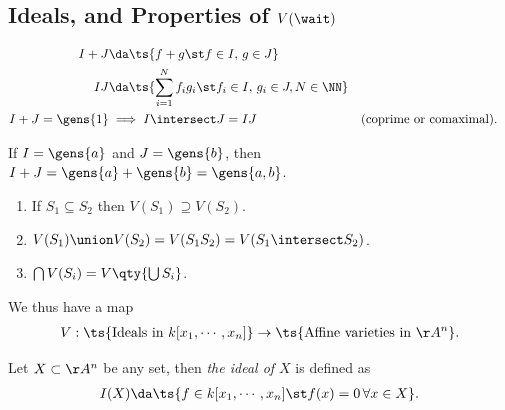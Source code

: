 \hypertarget{ideals-and-properties-of-vwait}{%
\subsection{\texorpdfstring{Ideals, and Properties of
\(V(\wait)\)}{Ideals, and Properties of V(\textbackslash wait)}}\label{ideals-and-properties-of-vwait}}

\begin{proposition}

\begin{align*}  
I+J   &\da \ts{f+g \st f\in I,\, g\in J} \\
IJ    &\da \ts{\sum_{i=1}^N f_i g_i \st f_i\in I,\, g_i\in J, N\in \NN} \\
I+J   = \gens{1} 
      &\implies I\intersect J = IJ && \text{(coprime or comaximal)}
.\end{align*}

\end{proposition}

\begin{fact}

If \(I = \gens{a}\) and \(J = \gens{b}\), then
\(I + J = \gens{a} + \gens{b} = \gens{a, b}\).

\end{fact}

\begin{proposition}[Properties of $V$]

\hfill

\begin{enumerate}
\def\labelenumi{\arabic{enumi}.}
\tightlist
\item
  If \(S_1 \subseteq S_2\) then \(V(S_1) \supseteq V(S_2)\).
\item
  \(V(S_1) \union V(S_2) = V(S_1 S_2) = V(S_1 \intersect S_2)\).
\item
  \(\bigcap V(S_i) = V\qty{\bigcup S_i}\).
\end{enumerate}

\end{proposition}

We thus have a map
\begin{align*}  
V: \ts{\text{Ideals in } k[x_1, \cdots, x_n]} \to \ts{\text{Affine varieties in } \AA^n}
.\end{align*}

\begin{definition}

Let \(X\subset \AA^n\) be any set, then \emph{the ideal of \(X\)} is
defined as
\begin{align*}  
I(X) \da\ts{f\in k[x_1, \cdots, x_n] \st f(x) = 0\, \forall x\in X}
.\end{align*}

\end{definition}

